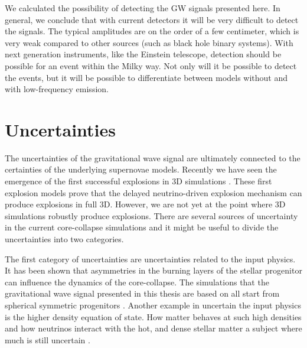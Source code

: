 We calculated the possibility of detecting the GW signals presented here. In general, we conclude that with current detectors it will be very difficult to detect the signals. The typical amplitudes are
on the order of a few centimeter, which is very weak compared to other sources (such as black hole binary systems).
With next generation instruments, like the Einstein telescope, detection should be possible for an event within the 
Milky way. Not only will it be possible to detect the events, but it will be possible to
differentiate between models without and with low-frequency emission.

\section{Uncertainties}
The uncertainties of the gravitational wave signal are ultimately connected to the certainties
of the underlying supernovae models. Recently we have seen the emergence of the first successful explosions 
in 3D simulations \citep{melson_15a,melson_15b,lentz_15,suma_models}. 
These first explosion models prove that the delayed neutrino-driven explosion mechanism can produce explosions in full 3D. 
However, we are not yet at the point where 3D simulations robustly produce explosions. 
There are several sources of uncertainty in the current core-collapse simulations and it might be useful to divide the uncertainties into two categories. 

The first category of uncertainties are uncertainties related to the input physics. 
It has been shown that asymmetries in the burning layers of the stellar progenitor can influence the dynamics of the core-collapse. 
The simulations that the gravitational wave signal presented in this thesis are based on all start from spherical symmetric progenitors
\citep{burrows_96,fryer_04,arnett_11,couch_13,mueller_15a}. 
Another example in uncertain the input physics is the higher density equation of state. 
How matter behaves at such high densities and how neutrinos interact with the hot, and dense 
stellar matter a subject where much is still uncertain \citep{fischer_14,lattimer_16}.

